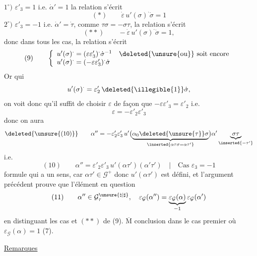 $1^\circ)$ \quad $\varepsilon'_3=1$ i.e. $\dot{\alpha}'=1$
la relation s'écrit
\[
(*)\qquad \dot{\varepsilon}\,u'(\sigma)^{\cdot}\dot{\sigma}=1
\]
$2^\circ)$ \quad $\varepsilon'_3=-1$ i.e. $\dot{\alpha}'=\dot{\tau}$,
comme $\tau\sigma=-\sigma\tau$, la relation s'écrit
\[
(**)\qquad -\dot{\varepsilon}\,u'(\sigma)^{\cdot}\dot{\sigma}=1,
\]
donc dans tous les cas, la relation s'écrit
\[
(9)\qquad
\left\{
\begin{array}{l}
u'(\sigma)^{\cdot}=(\varepsilon\varepsilon'_3)^{\cdot}
\dot{\sigma}^{-1}
\quad\deleted{\unsure{\text{ou}}}\ \text{soit encore}\\
u'(\sigma)^{\cdot}=(-\varepsilon\varepsilon'_3)^{\cdot}\dot{\sigma}
\end{array}
\right.
\]
Or 
qui 
\[
u'(\sigma)^{\cdot}
=\varepsilon'_2\,\deleted{\text{\illegible{1}}}\dot{\sigma},
\]
on voit donc qu'il suffit de choisir $\varepsilon$ de façon que
$-\varepsilon\varepsilon'_3=\varepsilon'_2$
i.e.
\[
\varepsilon=-\varepsilon'_2\varepsilon'_3
\]
donc on aura
\[
\deleted{\unsure{(10)}}\qquad
\alpha''=-\varepsilon'_2\varepsilon'_3\,
u'\bigl(
\underbrace{\alpha_0\deleted{\unsure{\tau}}\sigma}
_{\inserted{\alpha\tau\sigma=\alpha\tau'}}
\bigr)\alpha'\underbrace{\sigma\tau}_{\inserted{-\tau'}}
\]
i.e.
\[
(10)\qquad
\alpha''=\varepsilon'_2\varepsilon'_3\,u'(\alpha\tau')
(\alpha'\tau')
\quad\big|\quad\text{Cas }\varepsilon_3=-1
\]
formule qui a un sens, car $\alpha\tau'\in\mathcal{G}^{+}$ donc
$u'(\alpha\tau')$ est défini, et l'argument précédent prouve que
l'élément en question 
\[
(11)\qquad
\alpha''\in\mathcal{G}^{\unsure{\natural|\sharp}}_\tau,\quad
\varepsilon_{\mathcal{G}}(\alpha'')
=\underbrace{\varepsilon_{\mathcal{G}}(\alpha)}_{-1}
\varepsilon_{\mathcal{G}}(\alpha')
\]
en distinguant les cas \unsure{(*)} et $(**)$ de (9).
$\overline{\mathrm M}$ conclusion dans le cas premier où
$\varepsilon_{\mathcal{G}}(\alpha)=1$ (7).



\uline{Remarques} 


